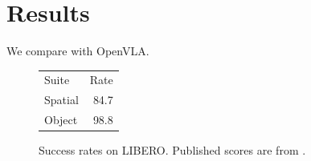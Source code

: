 \documentclass{article}
\begin{document}
\section{Results}
We compare with OpenVLA.

\begin{figure}[t]
\centering
\begin{tabular}{lr}
Suite & Rate \\
Spatial & 84.7 \\
Object & 98.8 \\
\end{tabular}
\caption{Success rates on LIBERO. Published scores are from \citet{kim}.}
\end{figure}



\end{document}
